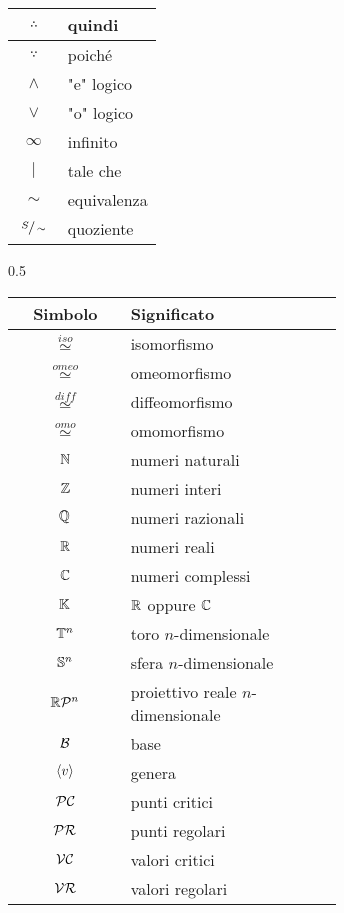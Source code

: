 \begin{table}[H]
{\begin{tabular}{|c|p{0.65\linewidth}|}
					\hline
					$ \therefore $ & quindi \\
					\hline
					$ \because $ & poiché \\
					\hline
					$ \land $ & "e" logico \\
					\hline
					$ \lor $ & "o" logico \\
					\hline
					$ \infty $ & infinito \\
					\hline
					$ \mid $ & tale che \\
					\hline
					$ \sim $ & equivalenza \\
					\hline
					$ \sfrac{S}{\sim} $ & quoziente \\
					\hline
				\end{tabular}
				}
		{0.5}{%
				\begin{tabular}{|c|p{0.65\linewidth}|}
					\hline
					\textbf{Simbolo} & \textbf{Significato} \\
					\hline
					\hline
					$ \stackrel{iso}{\simeq} $ & isomorfismo \\
					\hline
					$ \stackrel{omeo}{\simeq} $ & omeomorfismo \\
					\hline
					$ \stackrel{diff}{\simeq} $ & diffeomorfismo \\
					\hline
					$ \stackrel{omo}{\simeq} $ & omomorfismo \\
					\hline
					$ \N $ & numeri naturali \\
					\hline
					$ \Z $ & numeri interi \\
					\hline
					$ \Q $ & numeri razionali \\
					\hline
					$ \R $ & numeri reali \\
					\hline
					$ \C $ & numeri complessi \\
					\hline
					$ \K $ & $ \R $ oppure $ \C $ \\
					\hline
					$ \T^{n} $ & toro $ n $-dimensionale \\
					\hline
					$ \S^{n} $ & sfera $ n $-dimensionale \\
					\hline
					$ \rp{n} $ & proiettivo reale $ n $-dimensionale \\
					\hline
					$ \B $ & base \\
					\hline
					$ \ev{v} $ & genera \\
					\hline
					$ \PC $ &  punti critici \\
					\hline
					$ \PR $ &  punti regolari \\
					\hline
					$ \VC $ & valori critici \\
					\hline
					$ \VR $ & valori regolari \\

\end{tabular}}
\end{table}
